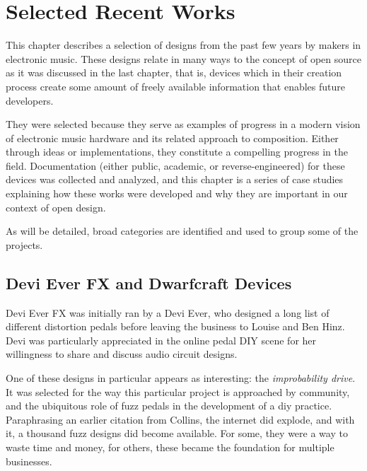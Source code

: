 \chapter{Selected Recent Works}\label{selrecworks}

This chapter describes a selection of designs from the past few years by makers in electronic music. These designs relate in many ways to the concept of open source as it was discussed in the last chapter, that is, devices which in their creation process create some amount of freely available information that enables future developers.

They were selected because they serve as examples of progress in a modern vision of electronic music hardware and its related approach to composition. Either through ideas or implementations, they constitute a compelling progress in the field. Documentation (either public, academic, or reverse-engineered) for these devices was collected and analyzed, and this chapter is a series of case studies explaining how these works were developed and why they are important in our context of open design. 

As will be detailed, broad categories are identified and used to group some of the projects. 

\section{Devi Ever FX and Dwarfcraft Devices}

Devi Ever FX was initially ran by a Devi Ever, who designed a long list of different distortion pedals before leaving the business to Louise and Ben Hinz. Devi was particularly appreciated in the online pedal DIY scene for her willingness to share and discuss audio circuit designs. 

One of these designs in particular appears as interesting: the \emph{improbability drive}. It was selected for the way this particular project is approached by community, and the ubiquitous role of fuzz pedals in the development of a diy practice. Paraphrasing an earlier citation from Collins, the internet did explode, and with it, a thousand fuzz designs did become available. For some, they were a way to waste time and money, for others, these became the foundation for multiple businesses. 

